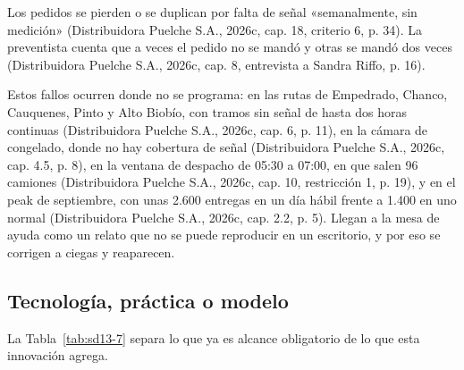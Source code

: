 Los pedidos se pierden o se duplican por falta de señal «semanalmente, sin medición» (Distribuidora Puelche S.A., 2026c, cap. 18, criterio 6, p. 34). La preventista cuenta que a veces el pedido no se mandó y otras se mandó dos veces (Distribuidora Puelche S.A., 2026c, cap. 8, entrevista a Sandra Riffo, p. 16).

Estos fallos ocurren donde no se programa: en las rutas de Empedrado, Chanco, Cauquenes, Pinto y Alto Biobío, con tramos sin señal de hasta dos horas continuas (Distribuidora Puelche S.A., 2026c, cap. 6, p. 11), en la cámara de congelado, donde no hay cobertura de señal (Distribuidora Puelche S.A., 2026c, cap. 4.5, p. 8), en la ventana de despacho de 05:30 a 07:00, en que salen 96 camiones (Distribuidora Puelche S.A., 2026c, cap. 10, restricción 1, p. 19), y en el peak de septiembre, con unas 2.600 entregas en un día hábil frente a 1.400 en uno normal (Distribuidora Puelche S.A., 2026c, cap. 2.2, p. 5). Llegan a la mesa de ayuda como un relato que no se puede reproducir en un escritorio, y por eso se corrigen a ciegas y reaparecen.

\subsection{Tecnología, práctica o modelo}

La Tabla~\ref{tab:sd13-7} separa lo que ya es alcance obligatorio de lo que esta innovación agrega.

